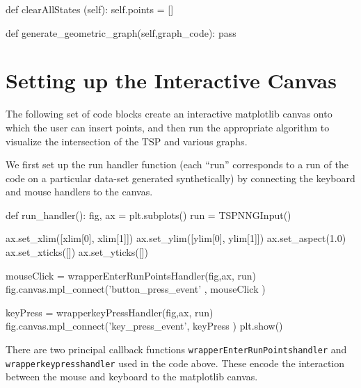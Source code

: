       def clearAllStates (self):
          self.points = []

      def generate_geometric_graph(self,graph_code):
           pass
\nwendcode{}\nwdocspar

\section{Setting up the Interactive Canvas}
The following set of code blocks create an interactive matplotlib canvas onto which the user can insert points, and then 
run the appropriate algorithm to visualize the intersection of the TSP and various graphs. 

We first set up the run handler function (each ``run'' corresponds to a run of the code on a particular data-set generated synthetically)
by connecting the keyboard and mouse handlers to the canvas. 

\nwenddocs{}\endmoddef\nwstartdeflinemarkup{}\nwenddeflinemarkup
def run_handler():
    fig, ax =  plt.subplots()
    run = TSPNNGInput()
    
    ax.set_xlim([xlim[0], xlim[1]])
    ax.set_ylim([ylim[0], ylim[1]])
    ax.set_aspect(1.0)
    ax.set_xticks([])
    ax.set_yticks([])
      
    mouseClick   = wrapperEnterRunPointsHandler(fig,ax, run)
    fig.canvas.mpl_connect('button_press_event' , mouseClick )
      
    keyPress     = wrapperkeyPressHandler(fig,ax, run)
    fig.canvas.mpl_connect('key_press_event', keyPress   )
    plt.show()
\nwendcode{}\nwdocspar



There are two principal callback functions \verb|wrapperEnterRunPointshandler| and \verb|wrapperkeypresshandler| used in the code above. 
These encode the interaction between the mouse and keyboard to the matplotlib canvas. 

